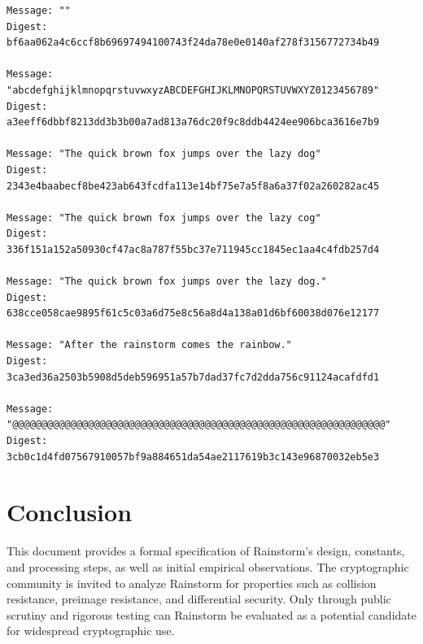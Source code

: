 \documentclass[11pt,a4paper]{article}
\begin{document}
{\small
\begin{verbatim}
Message: ""
Digest: bf6aa062a4c6ccf8b69697494100743f24da78e0e0140af278f3156772734b49

Message: "abcdefghijklmnopqrstuvwxyzABCDEFGHIJKLMNOPQRSTUVWXYZ0123456789"
Digest: a3eeff6dbbf8213dd3b3b00a7ad813a76dc20f9c8ddb4424ee906bca3616e7b9

Message: "The quick brown fox jumps over the lazy dog"
Digest: 2343e4baabecf8be423ab643fcdfa113e14bf75e7a5f8a6a37f02a260282ac45

Message: "The quick brown fox jumps over the lazy cog"
Digest: 336f151a152a50930cf47ac8a787f55bc37e711945cc1845ec1aa4c4fdb257d4

Message: "The quick brown fox jumps over the lazy dog."
Digest: 638cce058cae9895f61c5c03a6d75e8c56a8d4a138a01d6bf60038d076e12177

Message: "After the rainstorm comes the rainbow."
Digest: 3ca3ed36a2503b5908d5deb596951a57b7dad37fc7d2dda756c91124acafdfd1

Message: "@@@@@@@@@@@@@@@@@@@@@@@@@@@@@@@@@@@@@@@@@@@@@@@@@@@@@@@@@@@@@@@@"
Digest: 3cb0c1d4fd07567910057bf9a884651da54ae2117619b3c143e96870032eb5e3
\end{verbatim}
}

\section*{Conclusion}
This document provides a formal specification of Rainstorm’s design, constants, and processing steps, as well as initial empirical observations. The cryptographic community is invited to analyze Rainstorm for properties such as collision resistance, preimage resistance, and differential security. Only through public scrutiny and rigorous testing can Rainstorm be evaluated as a potential candidate for widespread cryptographic use.
\end{document}
